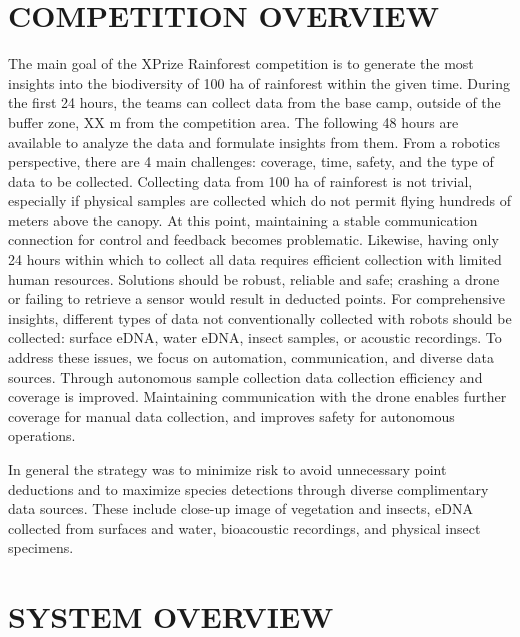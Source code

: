     \section{COMPETITION OVERVIEW}
    The main goal of the XPrize Rainforest competition is to generate the most insights into the biodiversity of 100 ha of rainforest within the given time. During the first 24 hours, the teams can collect data from the base camp, outside of the buffer zone, XX m from the competition area. The following 48 hours are available to analyze the data and formulate insights from them. From a robotics perspective, there are 4 main challenges: coverage, time, safety, and the type of data to be collected. Collecting data from 100 ha of rainforest is not trivial, especially if physical samples are collected which do not permit flying hundreds of meters above the canopy. At this point, maintaining a stable communication connection for control and feedback becomes problematic. Likewise, having only 24 hours within which to collect all data requires efficient collection with limited human resources. Solutions should be robust, reliable and safe; crashing a drone or failing to retrieve a sensor would result in deducted points. For comprehensive insights, different types of data not conventionally collected with robots should be collected: surface eDNA, water eDNA, insect samples, or acoustic recordings.
    To address these issues, we focus on automation, communication, and diverse data sources. Through autonomous sample collection data collection efficiency and coverage is improved. Maintaining communication with the drone enables further coverage for manual data collection, and improves safety for autonomous operations. 

    In general the strategy was to minimize risk to avoid unnecessary point deductions and to maximize species detections through diverse complimentary data sources. These include close-up image of vegetation and insects, eDNA collected from surfaces and water, bioacoustic recordings, and physical insect specimens.    
    
	\section{SYSTEM OVERVIEW}
    \label{sec:system_overview}
    
